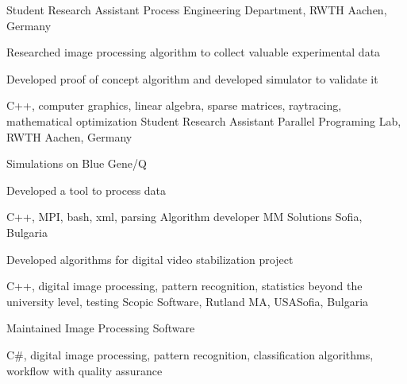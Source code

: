 {Student Research Assistant} 
{Process Engineering Department, RWTH}
{Aachen, Germany}
{ \item Researched image processing algorithm to collect valuable experimental data}
{ 
\item Developed proof of concept algorithm and developed simulator to validate it}
{C++, computer graphics, linear algebra, sparse matrices, raytracing, mathematical optimization}
{Student Research Assistant}
{Parallel Programing Lab, RWTH}
{Aachen, Germany}
{\item Simulations on Blue Gene/Q}
{\item Developed a tool to process data}
{ C++, MPI, bash, xml, parsing}
{Algorithm developer}
{MM Solutions}
{Sofia, Bulgaria}
{ \item Developed algorithms for digital video stabilization project}
{C++, digital image processing, pattern recognition, statistics beyond the university level, testing}
{Scopic Software, Rutland MA, USA}{Sofia, Bulgaria}
{\item Maintained Image Processing Software}
{C\#, digital image processing, pattern recognition, classification algorithms, workflow with quality assurance}

